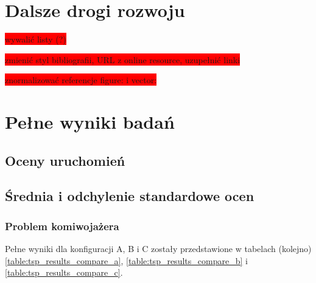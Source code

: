 \documentclass[twoside]{iisthesis}
\newcommand{\todo}{\colorbox{red}}
\begin{document}
\chapter{Dalsze drogi rozwoju}



\pagestyle{plain}

\todo{wywalić listy (?)}

\todo{zmienić styl bibliografii, URL z online resource, uzupełnić linki}

\todo{znormalizować referencje figure: i vector:}

\listoffigures
\listoftables
{}




\appendix \chapter{Pełne wyniki badań}
\section{Oceny uruchomień}

\section{Średnia i odchylenie standardowe ocen}

\subsection{Problem komiwojażera}

Pełne wyniki dla konfiguracji A, B i C zostały przedstawione w tabelach (kolejno) \ref{table:tsp_results_compare_a}, \ref{table:tsp_results_compare_b} i \ref{table:tsp_results_compare_c}.
\end{document}
